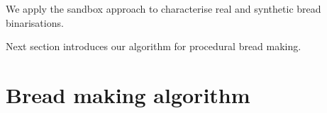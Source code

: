 \documentclass[final,5p,times]{elsarticle}
\begin{document}
{%


We apply the sandbox approach to characterise real and synthetic bread binarisations.

Next section introduces our algorithm for procedural bread making.

\section{Bread making algorithm}

}
\end{document}
